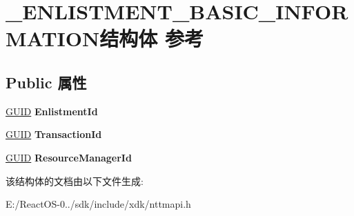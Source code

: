 \hypertarget{struct___e_n_l_i_s_t_m_e_n_t___b_a_s_i_c___i_n_f_o_r_m_a_t_i_o_n}{}\section{\+\_\+\+E\+N\+L\+I\+S\+T\+M\+E\+N\+T\+\_\+\+B\+A\+S\+I\+C\+\_\+\+I\+N\+F\+O\+R\+M\+A\+T\+I\+O\+N结构体 参考}
\label{struct___e_n_l_i_s_t_m_e_n_t___b_a_s_i_c___i_n_f_o_r_m_a_t_i_o_n}
\subsection*{Public 属性}
\begin{DoxyCompactItemize}
\item 
\mbox{\label{struct___e_n_l_i_s_t_m_e_n_t___b_a_s_i_c___i_n_f_o_r_m_a_t_i_o_n_a1887a4d65b5fff993892b7508c59766d}} 
\hyperlink{interface_g_u_i_d}{G\+U\+ID} {\bfseries Enlistment\+Id}
\item 
\mbox{\label{struct___e_n_l_i_s_t_m_e_n_t___b_a_s_i_c___i_n_f_o_r_m_a_t_i_o_n_adade3eb3c723c520abdeb20a68c4eab9}} 
\hyperlink{interface_g_u_i_d}{G\+U\+ID} {\bfseries Transaction\+Id}
\item 
\mbox{\label{struct___e_n_l_i_s_t_m_e_n_t___b_a_s_i_c___i_n_f_o_r_m_a_t_i_o_n_a0f64565af9ab8872f78b2b4ed068eda1}} 
\hyperlink{interface_g_u_i_d}{G\+U\+ID} {\bfseries Resource\+Manager\+Id}
\end{DoxyCompactItemize}


该结构体的文档由以下文件生成\+:\begin{DoxyCompactItemize}
\item 
E\+:/\+React\+O\+S-\/0../sdk/include/xdk/nttmapi.\+h\end{DoxyCompactItemize}
